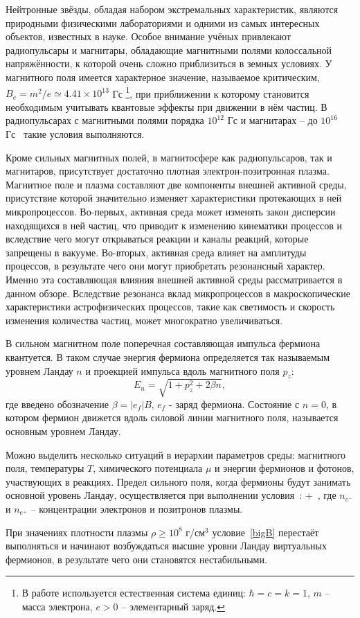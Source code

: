 Нейтронные звёзды, обладая набором экстремальных характеристик, являются природными физическими лабораториями и одними из самых интересных объектов, известных в науке. 
Особое внимание учёных привлекают радиопульсары и магнитары, обладающие магнитными полями колоссальной напряжённости, к которой очень сложно приблизиться в
земных условиях. У магнитного поля имеется характерное значение, называемое критическим, $B_e = m^2 / e \simeq 4.41 \times 10^{13}$ Гс \footnote{В работе используется естественная система единиц: 
$\hbar = c = k = 1$, $m$ -- масса электрона, $e > 0$ --  элементарный заряд.}, при приближении к которому становится необходимым учитывать квантовые эффекты при движении в нём частиц. 
В радиопульсарах с магнитными полями порядка $10^{12}$ Гс и магнитарах -- до $10^{16}$ Гс~\cite{Duncan:1995,Thompson:1996,Lyutikov:2002} такие условия выполняются.

Кроме сильных магнитных полей, в магнитосфере как радиопульсаров, так и магнитаров, присутствует достаточно плотная электрон-позитронная плазма. Магнитное поле и плазма составляют 
две компоненты внешней активной среды, присутствие которой значительно изменяет характеристики протекающих в ней микропроцессов. Во-первых, активная среда может изменять закон дисперсии 
находящихся в ней частиц, что приводит к изменению кинематики процессов и вследствие чего могут открываться реакции и каналы реакций, которые запрещены в вакууме. Во-вторых, активная среда 
влияет на амплитуды процессов, в результате чего они могут приобретать резонансный характер. Именно эта составляющая влияния внешней активной среды рассматривается в данном обзоре. 
Вследствие резонанса вклад микропроцессов в макроскопические характеристики астрофизических процессов, такие как светимость и скорость изменения количества частиц, может 
многократно увеличиваться.

В сильном магнитном поле поперечная составляющая импульса фермиона квантуется. В таком случае энергия фермиона определяется так называемым уровнем Ландау $n$ и проекцией импульса вдоль магнитного поля $p_z$:
\begin{equation}
E_n = \sqrt{1+p_z^2+2\beta n},
\end{equation}
%
где введено обозначение $\beta=|e_f|B$, $e_f$ - заряд фермиона. Состояние с $n = 0$, в котором фермион движется вдоль силовой линии магнитного поля, называется основным уровнем Ландау. 

Можно выделить несколько ситуаций в иерархии параметров среды: магнитного поля, температуры $T$, химического потенциала $\mu$ и энергии фермионов и фотонов, участвующих в реакциях.
Предел сильного поля, когда фермионы будут занимать основной уровень Ландау, осуществляется при выполнении условия~\cite{RCh:2008}:
%
\beq
\label{bigB}
 \gg {} + \,,
\eeq 
%
\noindent где $n_{e^{-}}$ и $n_{e^{+}}$ -- концентрации электронов и позитронов плазмы.

При значениях плотности плазмы $\rho \geqslant 10^8$ г/см$^3$ условие~\ref{bigB} перестаёт выполняться и начинают возбуждаться 
высшие уровни Ландау виртуальных фермионов, в результате чего они становятся нестабильными.  